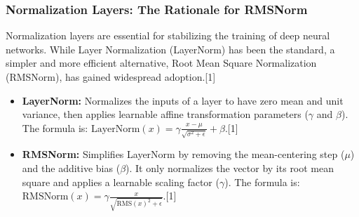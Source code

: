 \documentclass[12pt, a4paper]{article}
\begin{document}
\begin{table}[h!]
\centering
\caption{Comparison of Positional Encoding Methods}
\label{tab:pos_enc}
\end{table}

\subsubsection{Normalization Layers: The Rationale for RMSNorm}

Normalization layers are essential for stabilizing the training of deep neural networks. While Layer Normalization (LayerNorm) has been the standard, a simpler and more efficient alternative, Root Mean Square Normalization (RMSNorm), has gained widespread adoption.[1]

\begin{itemize}
    \item \textbf{LayerNorm:} Normalizes the inputs of a layer to have zero mean and unit variance, then applies learnable affine transformation parameters ($\gamma$ and $\beta$). The formula is: $\text{LayerNorm}(x) = \gamma \frac{x - \mu}{\sqrt{\sigma^2 + \epsilon}} + \beta$.[1]
    \item \textbf{RMSNorm:} Simplifies LayerNorm by removing the mean-centering step ($\mu$) and the additive bias ($\beta$). It only normalizes the vector by its root mean square and applies a learnable scaling factor ($\gamma$). The formula is: $\text{RMSNorm}(x) = \gamma \frac{x}{\sqrt{\text{RMS}(x)^2 + \epsilon}}$.[1]
\end{itemize}
\end{document}
